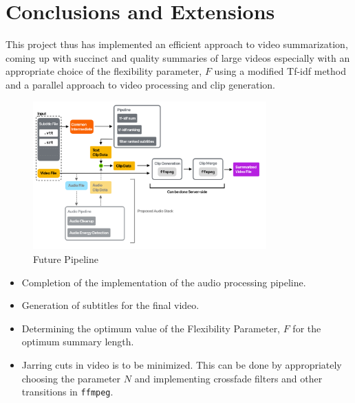 
\chapter{Conclusions and Extensions} %

\label{Chapter5} %



This project thus has implemented an efficient approach to video summarization, coming up with succinct and quality summaries of large videos especially with an appropriate choice of the flexibility parameter, $F$ using a modified Tf-idf method and a parallel approach to video processing and clip generation.

		\begin{figure}[!ht]
			\centering
				\includegraphics[width=0.8\textwidth, keepaspectratio=true]{Future}	
				\caption{Future Pipeline}
				\label{futurepipeline}
		\end{figure}

\begin{itemize}
			\item Completion of the implementation of the audio processing pipeline.
			\item Generation of subtitles for the final video.
			\item Determining the optimum value of the Flexibility Parameter, $F$ for the optimum summary length.
			\item Jarring cuts in video is to be minimized. This can be done by appropriately choosing the parameter \(N\) and implementing crossfade filters and other transitions in \verb|ffmpeg|.
		\end{itemize}
